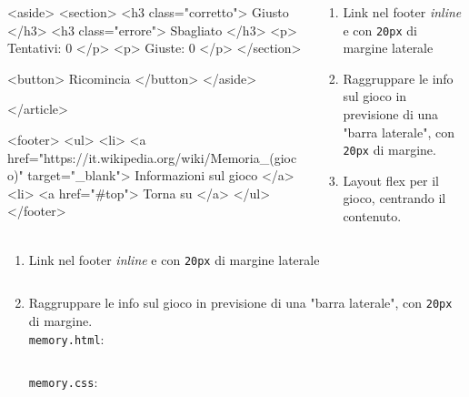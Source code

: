 \begin{frame}[fragile]
\begin{exercise}
\begin{columns}
\begin{column}{.45\textwidth}
{<aside>
    <section>
        <h3 class="corretto"> Giusto </h3>
        <h3 class="errore"> Sbagliato </h3>
        <p> Tentativi: 0 </p>
        <p> Giuste: 0 </p>
    </section>

    <button> Ricomincia </button>
</aside>

</article>

<footer>
    <ul>
        <li> <a href="https://it.wikipedia.org/wiki/Memoria_(gioco)" target="_blank"> Informazioni sul gioco </a>
        <li> <a href="#top"> Torna su </a>
    </ul>
</footer>}
      \end{column}
      \begin{column}{.45\textwidth}
        \begin{enumerate}
          \item Link nel footer \emph{inline} e con \texttt{20px} di margine laterale
          \item Raggruppare le info sul gioco in previsione di una "barra laterale", con \texttt{20px} di margine.
          \item Layout flex per il gioco, centrando il contenuto.
        \end{enumerate}
      \end{column}
    \end{columns}
  \end{exercise}
\end{frame}

\begin{frame}[fragile]\transfade
  \begin{sol}\centering
    \begin{enumerate}
      \item Link nel footer \emph{inline} e con \texttt{20px} di margine laterale
\makeatletter
      \inputminted[breaklines, firstline=50, lastline=53]{css}{\html@dir/\jobname _\thehtml@count.html}
      \makeatother
    \end{enumerate}
  \end{sol}
\end{frame}

\begin{frame}[fragile]\transfade
  \begin{sol}\centering
    \begin{enumerate}
      \setcounter{enumi}{1}
      \item Raggruppare le info sul gioco in previsione di una "barra laterale", con \texttt{20px} di margine.\\
      \texttt{memory.html}:
      \makeatletter
      \inputminted[breaklines, firstline=99, lastline=108]{html}{\html@dir/\jobname _\thehtml@count.html}
      \texttt{memory.css}:
      \inputminted[breaklines, firstline=41, lastline=43]{css}{\html@dir/\jobname _\thehtml@count.html}
      \makeatother
    \end{enumerate}
  \end{sol}
\end{frame}

